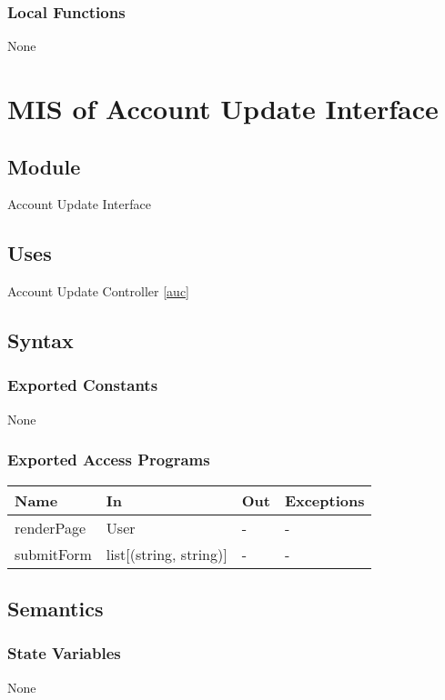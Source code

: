 \documentclass[12pt, titlepage]{article}
\begin{document}
\subsubsection{Local Functions}
None

\section{MIS of Account Update Interface} \label{aui}

\subsection{Module}

Account Update Interface

\subsection{Uses}

Account Update Controller \ref{auc}

\subsection{Syntax}

\subsubsection{Exported Constants}
None
\subsubsection{Exported Access Programs}

\begin{center}
\begin{tabular}{p{2cm} p{4cm} p{4cm} p{2cm}}
\hline
\textbf{Name} & \textbf{In} & \textbf{Out} & \textbf{Exceptions} \\
\hline
renderPage & User & - & - \\
submitForm & list[(string, string)] & - & - \\
\hline
\end{tabular}
\end{center}

\subsection{Semantics}

\subsubsection{State Variables}
None
\end{document}
